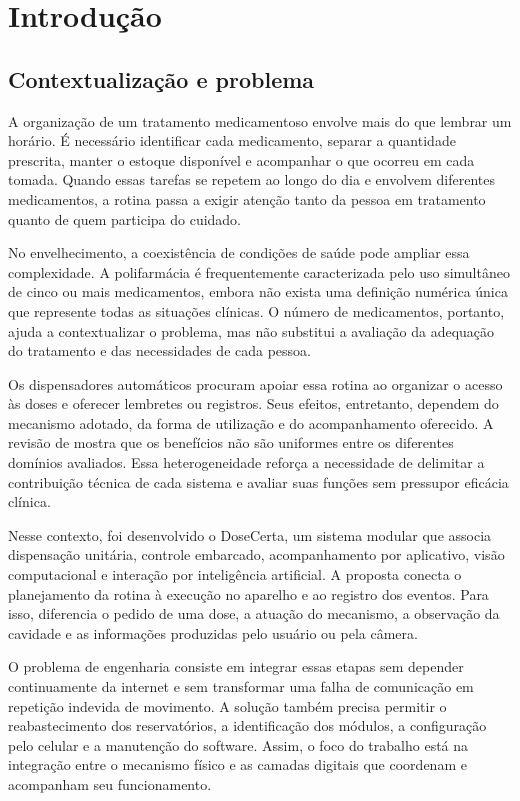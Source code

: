 \chapter{Introdução}\label{cap:introducao}
\section{Contextualização e problema}
A organização de um tratamento medicamentoso envolve mais do que lembrar um horário. É necessário identificar cada medicamento, separar a quantidade prescrita, manter o estoque disponível e acompanhar o que ocorreu em cada tomada. Quando essas tarefas se repetem ao longo do dia e envolvem diferentes medicamentos, a rotina passa a exigir atenção tanto da pessoa em tratamento quanto de quem participa do cuidado.

No envelhecimento, a coexistência de condições de saúde pode ampliar essa complexidade. A polifarmácia é frequentemente caracterizada pelo uso simultâneo de cinco ou mais medicamentos, embora não exista uma definição numérica única que represente todas as situações clínicas. O número de medicamentos, portanto, ajuda a contextualizar o problema, mas não substitui a avaliação da adequação do tratamento e das necessidades de cada pessoa. \cite{MASNOON2017}

Os dispensadores automáticos procuram apoiar essa rotina ao organizar o acesso às doses e oferecer lembretes ou registros. Seus efeitos, entretanto, dependem do mecanismo adotado, da forma de utilização e do acompanhamento oferecido. A revisão de  mostra que os benefícios não são uniformes entre os diferentes domínios avaliados. Essa heterogeneidade reforça a necessidade de delimitar a contribuição técnica de cada sistema e avaliar suas funções sem pressupor eficácia clínica.

Nesse contexto, foi desenvolvido o DoseCerta, um sistema modular que associa dispensação unitária, controle embarcado, acompanhamento por aplicativo, visão computacional e interação por inteligência artificial. A proposta conecta o planejamento da rotina à execução no aparelho e ao registro dos eventos. Para isso, diferencia o pedido de uma dose, a atuação do mecanismo, a observação da cavidade e as informações produzidas pelo usuário ou pela câmera.

O problema de engenharia consiste em integrar essas etapas sem depender continuamente da internet e sem transformar uma falha de comunicação em repetição indevida de movimento. A solução também precisa permitir o reabastecimento dos reservatórios, a identificação dos módulos, a configuração pelo celular e a manutenção do software. Assim, o foco do trabalho está na integração entre o mecanismo físico e as camadas digitais que coordenam e acompanham seu funcionamento.

